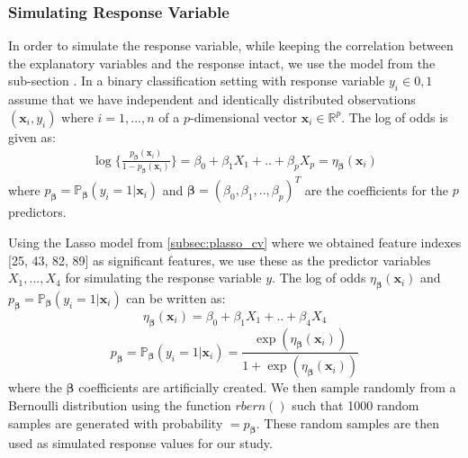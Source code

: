 \subsubsection{Simulating Response Variable} \label{subsubsec:simresponse}
In order to simulate the response variable, while keeping the correlation between the explanatory variables and the response intact, we use the model from the sub-section . In a binary classification setting with response variable $y_i \in{0,1}$ assume that we have independent and identically distributed observations $(\mathbf{x}_i, y_i)$ where $i=1, . . . , n$ of a $p$-dimensional vector $\mathbf{x}_i \in \mathbb{R}^p$. The log of odds is given as:
\begin{equation*}
\begin{split}
\log\{\frac{p_{\pmb{\beta}}(\mathbf{x}_i)}{1-p_{\pmb{\beta}}(\mathbf{x}_i)}\}=\beta_0+\beta_1X_1+..+\beta_pX_p=\eta_{\pmb{\beta}}(\mathbf{x}_i)
\end{split}
\end{equation*}
where $p_{\pmb{\beta}} = \mathbb{P}_{\pmb{\beta}}(y_i=1|\mathbf{x}_i)$ and $\pmb{\beta}=(\beta_0,\beta_1, .., \beta_p)^T$ are the coefficients for the $p$ predictors.\par
Using the Lasso model from \autoref{subsec:plasso_cv} where we obtained feature indexes [25, 43, 82, 89] as significant features, we use these as the predictor variables $X_1,...,X_4$ for simulating the response variable $y$. The log of odds $\eta_{\pmb{\beta}}(\mathbf{x}_i)$ and $p_{\pmb{\beta}}=\mathbb{P}_{\pmb{\beta}}(y_i=1|\mathbf{x}_i)$ can be written as:
\begin{equation}\label{eq:9}
\eta_{\pmb{\beta}}(\mathbf{x}_i)=\beta_0+\beta_1X_1+..+\beta_4X_4
\end{equation}
\begin{equation}\label{eq:10}
p_{\pmb{\beta}} = \mathbb{P}_{\pmb{\beta}}(y_i=1|\mathbf{x}_i) =  \frac{\exp(\eta_{\pmb{\beta}}(\mathbf{x}_i))}{1+\exp(\eta_{\pmb{\beta}}(\mathbf{x}_i))}
\end{equation}
where the $\pmb{\beta}$ coefficients are artificially created. We then sample randomly from a Bernoulli distribution using the function $rbern()$ such that 1000 random samples are generated with probability $=p_{\pmb{\beta}}$. These random samples are then used as simulated response values for our study.\par

